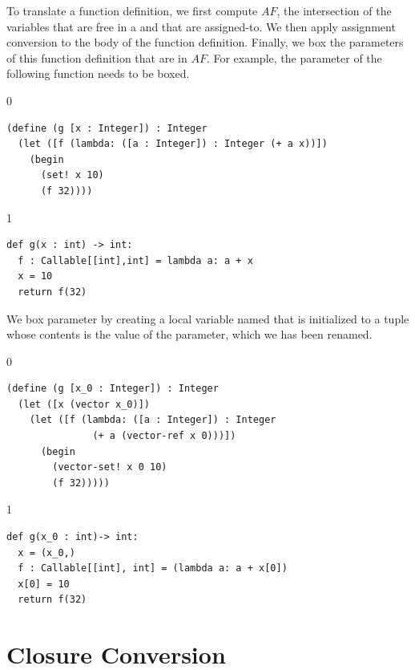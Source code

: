 \documentclass[7x10,nocrop]{TimesAPriori_MIT}%
\def\racketEd{0}
\def\pythonEd{1}
\def\edition{0}
\begin{document}
To translate a function definition, we first compute $\mathit{AF}$,
the intersection of the variables that are free in a  and
that are assigned-to. We then apply assignment conversion to the body
of the function definition. Finally, we box the parameters of this
function definition that are in $\mathit{AF}$. For example,
the parameter  of the following function 
needs to be boxed.
{\if\edition\racketEd
\begin{lstlisting}
(define (g [x : Integer]) : Integer
  (let ([f (lambda: ([a : Integer]) : Integer (+ a x))])
    (begin
      (set! x 10)
      (f 32))))
\end{lstlisting}
\fi}
%
{\if\edition\pythonEd
\begin{lstlisting}
def g(x : int) -> int:
  f : Callable[[int],int] = lambda a: a + x
  x = 10
  return f(32)
\end{lstlisting}
\fi}
%
\noindent We box parameter  by creating a local variable named
 that is initialized to a tuple whose contents is the value of
the parameter, which we has been renamed.
%
{\if\edition\racketEd
\begin{lstlisting}
(define (g [x_0 : Integer]) : Integer
  (let ([x (vector x_0)])
    (let ([f (lambda: ([a : Integer]) : Integer
               (+ a (vector-ref x 0)))])
      (begin 
        (vector-set! x 0 10)
        (f 32)))))
\end{lstlisting}
\fi}
%
{\if\edition\pythonEd
\begin{lstlisting}
def g(x_0 : int)-> int:
  x = (x_0,)
  f : Callable[[int], int] = (lambda a: a + x[0])
  x[0] = 10
  return f(32)
\end{lstlisting}
\fi}


\section{Closure Conversion}
\label{sec:closure-conversion}
\end{document}
